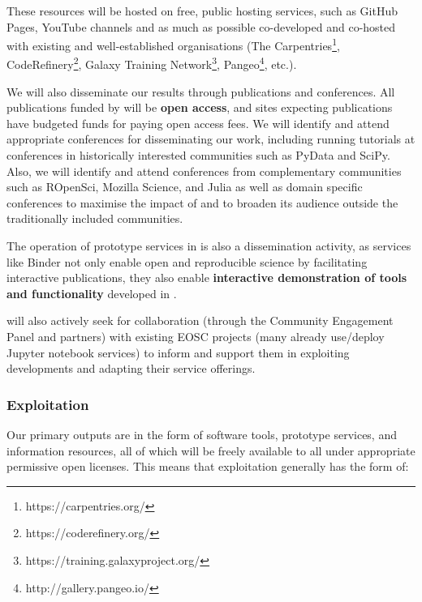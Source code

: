 These resources will be hosted on free, public hosting services,
such as GitHub Pages, YouTube channels and as much as possible co-developed and co-hosted with existing and
well-established organisations
(The Carpentries\footnote{https://carpentries.org/}, CodeRefinery\footnote{https://coderefinery.org/},
Galaxy Training Network\footnote{https://training.galaxyproject.org/}, Pangeo\footnote{http://gallery.pangeo.io/}, etc.).

We will also disseminate our results through publications and conferences.
All publications funded by \TheProject will be \textbf{open access},
and sites expecting publications have budgeted funds for paying open access fees.
We will identify and attend appropriate conferences for disseminating our work,
including running tutorials at conferences in historically interested communities such as PyData and SciPy.
Also, we will identify and attend conferences from complementary communities such as ROpenSci,
Mozilla Science, and Julia
as well as domain specific conferences to maximise the impact of \TheProject and to broaden its
audience outside the
traditionally included communities.

The operation of prototype services in  is also a dissemination activity,
as services like Binder not only enable open and reproducible science by facilitating interactive publications,
they also enable \textbf{interactive demonstration of tools and functionality}
developed in \TheProject.

\TheProject will also actively seek for collaboration (through the Community
Engagement Panel and
\TheProject partners) with existing EOSC projects (many already use/deploy
Jupyter notebook services) to inform and support them in exploiting \TheProject
developments and adapting their service offerings.
\subsubsection{Exploitation}

Our primary outputs are in the form of software tools, prototype services, and information resources,
all of which will be freely available to all under appropriate permissive open licenses.
This means that exploitation generally has the form of:

